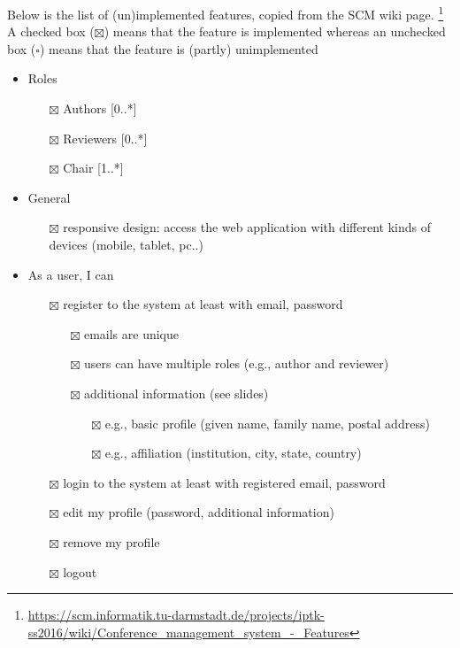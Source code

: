 \documentclass[nochapterpage,nopartpage,noheadingspace,numbersubsubsec,bigchapter,colorback,accentcolor=tud9c,10pt]{tudreport}
\begin{document}
    Below is the list of (un)implemented features, copied from the SCM wiki page.%
    \footnote{\url{https://scm.informatik.tu-darmstadt.de/projects/iptk-ss2016/wiki/Conference_management_system_-_Features}}
    A checked box ($\boxtimes$) means that the feature is implemented whereas an unchecked box ($\square$) means that the feature is (partly) unimplemented
        \begin{itemize}
            \setlength\itemsep{0em}
            \item Roles
            \begin{itemize}
                \item[$\boxtimes$] Authors [0..*]
                \item[$\boxtimes$] Reviewers [0..*]
                \item[$\boxtimes$] Chair [1..*]
            \end{itemize}

            \item General
            \begin{itemize}
                \item[$\boxtimes$] responsive design: access the web application with different kinds of devices (mobile, tablet, pc..)
            \end{itemize}

            \item As a user, I can
            \begin{itemize}
                \item[$\boxtimes$] register to the system at least with email, password
                \begin{itemize}
                    \item[$\boxtimes$] emails are unique
                    \item[$\boxtimes$] users can have multiple roles (e.g., author and reviewer)
                    \item[$\boxtimes$] additional information (see slides)
                    \begin{itemize}
                        \item[$\boxtimes$] e.g., basic profile (given name, family name, postal address)
                        \item[$\boxtimes$] e.g., affiliation (institution, city, state, country)
                    \end{itemize}
                \end{itemize}
                \item[$\boxtimes$] login to the system at least with registered email, password
                \item[$\boxtimes$] edit my profile (password, additional information)
                \item[$\boxtimes$] remove my profile
                \item[$\boxtimes$] logout
            \end{itemize}


\end{itemize}
\end{document}
